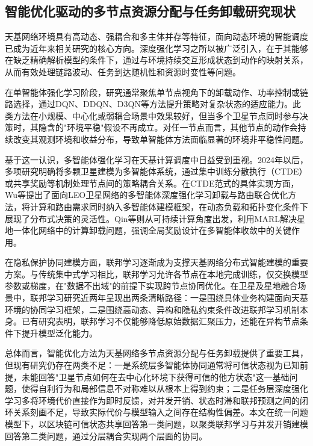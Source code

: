\subsection{智能优化驱动的多节点资源分配与任务卸载研究现状}

天基网络环境具有高动态、强耦合和多主体并存等特征，面向动态环境的智能调度已成为近年来相关研究的核心方向。深度强化学习之所以被广泛引入，在于其能够在缺乏精确解析模型的条件下，通过与环境持续交互形成状态到动作的映射关系，从而有效处理链路波动、任务到达随机性和资源时变性等问题\cite{Mnih2015dqn,VanHasselt2016DoubleDQN,Wang2016Dueling,Tang2022DRL,Shuai2024Qlearning}。

在单智能体强化学习阶段，研究通常聚焦单节点视角下的卸载动作、功率控制或链路选择，通过DQN、DDQN、D3QN等方法提升策略对复杂状态的适应能力。此类方法在小规模、中心化或弱耦合场景中效果较好，但当多个卫星节点同时参与决策时，其隐含的"环境平稳"假设不再成立。对任一节点而言，其他节点的动作会持续改变其观测环境和收益分布，导致单智能体方法面临显著的环境非平稳性问题。

基于这一认识，多智能体强化学习在天基计算调度中日益受到重视。2024年以后，多项研究明确将多颗卫星建模为多智能体系统，通过集中训练分散执行（CTDE）或共享奖励等机制处理节点间的策略耦合关系\cite{Lowe2017,Sunehag2018VDN,Rashid2018QMIX,Li2024MARLComCom,Xiu2025MARATD3,ref23}。在CTDE范式的具体实现方面，Wu等提出了面向LEO卫星网络的多智能体深度强化学习卸载与路由联合优化方法，将计算和路由需求同时纳入多智能体建模框架，在动态负载和拓扑变化条件下展现了分布式决策的灵活性\cite{ref23}。Qin等则从可持续计算角度出发，利用MARL解决星地一体化网络中的计算卸载问题，强调全局奖励设计在多智能体收敛中的关键作用\cite{Qin2023MARL}。

在隐私保护协同建模方面，联邦学习逐渐成为支撑天基网络分布式智能建模的重要方案。与传统集中式学习相比，联邦学习允许各节点在本地完成训练，仅交换模型参数或梯度，在"数据不出域"的前提下实现跨节点协同优化\cite{McMahan2017,Bonawitz2019,Li2020FederatedChallenges,Kairouz2021Advances,Matthiesen2024FLSatellites}。在卫星及星地融合场景中，联邦学习研究近两年呈现出两条清晰路径：一是围绕具体业务构建面向天基环境的协同学习框架，二是围绕高动态、异构和隐私约束条件改进联邦学习机制本身\cite{Li2020FedProx,Karimireddy2020Scaffold,ref26}。已有研究表明，联邦学习不仅能够降低原始数据汇聚压力，还能在异构节点条件下提升模型泛化能力。

总体而言，智能优化方法为天基网络多节点资源分配与任务卸载提供了重要工具，但现有研究仍存在两类不足：一是系统层多智能体协同通常将可信状态视为已知前提，未能回答"卫星节点如何在去中心化环境下获得可信的他方状态"这一基础问题，使得自利行为和局部信息不对称难以从根本上得到约束；二是任务层深度强化学习多将环境代价直接作为即时反馈，对并发开销、状态时滞和联邦预测之间的闭环关系刻画不足，导致实际代价与模型输入之间存在结构性偏差。本文在统一问题模型下，以区块链可信状态共享回答第一类问题，以聚类联邦学习与并发开销建模回答第二类问题，通过分层耦合实现两个层面的协同。

